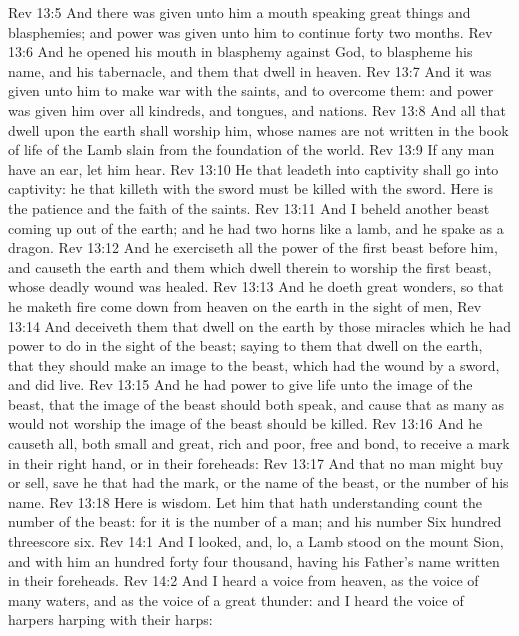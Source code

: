 \vs Rev 13:5 And there was given unto him a mouth speaking great things and blasphemies; and power was given unto him to continue forty  two months.
\vs Rev 13:6 And he opened his mouth in blasphemy against God, to blaspheme his name, and his tabernacle, and them that dwell in heaven.
\vs Rev 13:7 And it was given unto him to make war with the saints, and to overcome them: and power was given him over all kindreds, and tongues, and nations.
\vs Rev 13:8 And all that dwell upon the earth shall worship him, whose names are not written in the book of life of the Lamb slain from the foundation of the world.
\vs Rev 13:9 If any man have an ear, let him hear.
\vs Rev 13:10 He that leadeth into captivity shall go into captivity: he that killeth with the sword must be killed with the sword. Here is the patience and the faith of the saints.
\vs Rev 13:11 And I beheld another beast coming up out of the earth; and he had two horns like a lamb, and he spake as a dragon.
\vs Rev 13:12 And he exerciseth all the power of the first beast before him, and causeth the earth and them which dwell therein to worship the first beast, whose deadly wound was healed.
\vs Rev 13:13 And he doeth great wonders, so that he maketh fire come down from heaven on the earth in the sight of men,
\vs Rev 13:14 And deceiveth them that dwell on the earth by  those miracles which he had power to do in the sight of the beast; saying to them that dwell on the earth, that they should make an image to the beast, which had the wound by a sword, and did live.
\vs Rev 13:15 And he had power to give life unto the image of the beast, that the image of the beast should both speak, and cause that as many as would not worship the image of the beast should be killed.
\vs Rev 13:16 And he causeth all, both small and great, rich and poor, free and bond, to receive a mark in their right hand, or in their foreheads:
\vs Rev 13:17 And that no man might buy or sell, save he that had the mark, or the name of the beast, or the number of his name.
\vs Rev 13:18 Here is wisdom. Let him that hath understanding count the number of the beast: for it is the number of a man; and his number  Six hundred threescore  six.
\vs Rev 14:1 And I looked, and, lo, a Lamb stood on the mount Sion, and with him an hundred forty  four thousand, having his Father's name written in their foreheads.
\vs Rev 14:2 And I heard a voice from heaven, as the voice of many waters, and as the voice of a great thunder: and I heard the voice of harpers harping with their harps:
